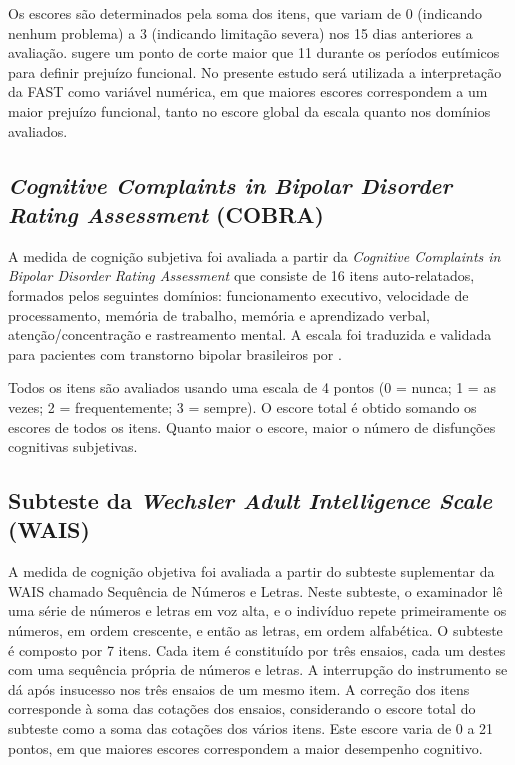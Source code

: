 \documentclass[chapter=TITLE,
               oneside,
               12pt,
               a4paper,
               english,
               brazil]{abntex2}    %
\begin{document}
            Os escores são determinados pela soma dos itens, que variam de
            0 (indicando nenhum problema) a 3 (indicando limitação severa)
            nos 15 dias anteriores a avaliação.
            \textcite{rosa_validity_2007} sugere um ponto de corte maior
            que 11 durante os períodos eutímicos para definir prejuízo
            funcional. No presente estudo será utilizada a interpretação
            da FAST como variável numérica, em que maiores escores correspondem
            a um maior prejuízo funcional, tanto no escore global da escala
            quanto nos domínios avaliados.
    
        \subsection{\textit{Cognitive Complaints in Bipolar Disorder Rating Assessment} 
        (COBRA)}
        \label{sec:cobra}
    
            A medida de cognição subjetiva foi avaliada a partir da
            \textit{Cognitive Complaints in Bipolar Disorder Rating Assessment}
            que consiste de 16 itens auto-relatados, formados pelos seguintes domínios:
            funcionamento executivo, velocidade de processamento, memória de trabalho,
            memória e aprendizado verbal, atenção/concentração e rastreamento mental.
            A escala foi traduzida e validada para pacientes com transtorno bipolar
            brasileiros por \textcite{lima_validity_2018}.

            Todos os itens são avaliados usando uma escala de 4 pontos
            (0 = nunca; 1 = as vezes; 2 = frequentemente; 3 = sempre).
            O escore total é obtido somando os escores de todos os itens.
            Quanto maior o escore, maior o número de disfunções cognitivas subjetivas.
    
        \subsection{Subteste da \textit{Wechsler Adult Intelligence Scale} (WAIS)}
        \label{sec:wais}
    
            A medida de cognição objetiva foi avaliada a partir do subteste
            suplementar da WAIS chamado Sequência de Números e Letras.
            Neste subteste, o examinador lê uma série de números e
            letras em voz alta, e o indivíduo repete primeiramente os números,
            em ordem crescente, e então as letras, em ordem alfabética.
            O subteste é composto por 7 itens.
            Cada item é constituído por três ensaios, cada um destes com uma
            sequência própria de números e letras.
            A interrupção do instrumento se dá após insucesso nos três ensaios
            de um mesmo item.
            A correção dos itens corresponde à soma das cotações dos ensaios,
            considerando o escore total do subteste como a soma das cotações
            dos vários itens. Este escore varia de 0 a 21 pontos, em que maiores
            escores correspondem a maior desempenho cognitivo.
    
\end{document}
